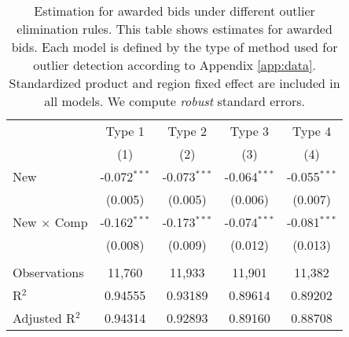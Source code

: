 
\begin{table}[H]
   \centering
   \begin{tabular}{lcccc}
      \toprule
                                & Type 1         & Type 2         & Type 3         & Type 4 \\   
                                & (1)            & (2)            & (3)            & (4)\\  
      \midrule 
      New                       & -0.072$^{***}$ & -0.073$^{***}$ & -0.064$^{***}$ & -0.055$^{***}$\\   
                                & (0.005)        & (0.005)        & (0.006)        & (0.007)\\   
      New $\times$ Comp  & -0.162$^{***}$ & -0.173$^{***}$ & -0.074$^{***}$ & -0.081$^{***}$\\   
                                & (0.008)        & (0.009)        & (0.012)        & (0.013)\\   
       \\
      Observations              & 11,760         & 11,933         & 11,901         & 11,382\\  
      R$^2$                     & 0.94555        & 0.93189        & 0.89614        & 0.89202\\  
      Adjusted R$^2$            & 0.94314        & 0.92893        & 0.89160        & 0.88708\\  
      \bottomrule
   \end{tabular}
   
   \par \raggedright 
   \caption{Estimation for awarded bids  under different outlier elimination rules. This table shows estimates for awarded bids. Each model is defined by the type of method used for outlier detection according to Appendix \ref{app:data}. Standardized product and region fixed effect are included in all models. We compute \textit{robust} standard errors.}
\end{table}


